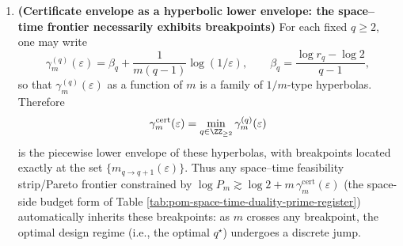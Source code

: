 \begin{remark}
\begin{enumerate}
  \[
  \boxed{\ \gamma_\infty=\log(r_2/2)=0.2155928379\ldots\ }.
  \]
  This limit is strictly less than the worst-fiber endpoint exponent \(\log\sqrt{\varphi}\) (equivalent to \(\lim_{q\to\infty}\beta_q\), see Remark \ref{rem:pom-betaq-isa}), demonstrating that the quantile certificate in the constant failure-rate regime genuinely detaches from worst-case scaling; the deficit is an explicit constant \(\log\sqrt{\varphi}-\log(r_2/2)\).
  \item \textbf{(Certificate envelope as a hyperbolic lower envelope: the space--time frontier necessarily exhibits breakpoints)}
  For each fixed \(q\ge 2\), one may write
  \[
  \gamma^{(q)}_m(\varepsilon)=\beta_q+\frac{1}{m(q-1)}\log(1/\varepsilon),
  \qquad
  \beta_q=\frac{\log r_q-\log 2}{q-1},
  \]
  so that \(\gamma^{(q)}_m(\varepsilon)\) as a function of \(m\) is a family of \(1/m\)-type hyperbolas. Therefore
  \[
  \gamma^{\mathrm{cert}}_m(\varepsilon)=\min_{q\in\ZZ_{\ge 2}}\gamma^{(q)}_m(\varepsilon)
  \]
  is the piecewise lower envelope of these hyperbolas, with breakpoints located exactly at the set \(\{m_{q\to q+1}(\varepsilon)\}\).
  Thus any space--time feasibility strip/Pareto frontier constrained by
  \(
  \log P_m\gtrsim \log 2+m\,\gamma^{\mathrm{cert}}_m(\varepsilon)
  \)
  (the space-side budget form of Table \ref{tab:pom-space-time-duality-prime-register}) automatically inherits these breakpoints: as \(m\) crosses any breakpoint, the optimal design regime (i.e., the optimal \(q^\star\)) undergoes a discrete jump.
\end{enumerate}
\end{remark}



